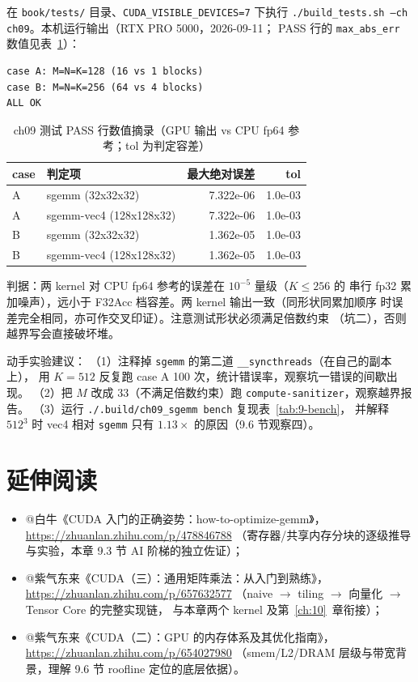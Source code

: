 在 \texttt{book/tests/} 目录、\texttt{CUDA\_\allowbreak{}VISIBLE\_\allowbreak{}DEVICES=\allowbreak{}7} 下执行
\texttt{.\allowbreak{}/\allowbreak{}build\_\allowbreak{}tests.\allowbreak{}sh --ch ch09}。本机运行输出（RTX PRO 5000，2026-09-11；
PASS 行的 \texttt{max\_abs\_err} 数值见表~\ref{tab:9-pass}）：

\begin{lstlisting}[style=console]
case A: M=N=K=128 (16 vs 1 blocks)
case B: M=N=K=256 (64 vs 4 blocks)
ALL OK
\end{lstlisting}

\begin{table}[htbp]
\centering
\caption{ch09 测试 PASS 行数值摘录（GPU 输出 vs CPU fp64 参考；tol 为判定容差）}
\label{tab:9-pass}
\begin{tabular}{llrr}
\toprule
case & 判定项 & 最大绝对误差 & tol \\
\midrule
A & sgemm (32x32x32)      & 7.322e-06 & 1.0e-03 \\
A & sgemm-vec4 (128x128x32) & 7.322e-06 & 1.0e-03 \\
B & sgemm (32x32x32)      & 1.362e-05 & 1.0e-03 \\
B & sgemm-vec4 (128x128x32) & 1.362e-05 & 1.0e-03 \\
\bottomrule
\end{tabular}
\end{table}

判据：两 kernel 对 CPU fp64 参考的误差在 $10^{-5}$ 量级（$K \le 256$ 的
串行 fp32 累加噪声），远小于 F32Acc 档容差。两 kernel 输出一致（同形状同累加顺序
时误差完全相同，亦可作交叉印证）。注意测试形状必须满足倍数约束
（坑二），否则越界写会直接破坏堆。

动手实验建议：
（1）注释掉 \texttt{sgemm} 的第二道 \texttt{\_\allowbreak{}\_\allowbreak{}syncthreads}（在自己的副本上），
用 $K = 512$ 反复跑 case A 100 次，统计错误率，观察坑一错误的间歇出现。
（2）把 $M$ 改成 33（不满足倍数约束）跑 \texttt{compute-sanitizer}，观察越界报告。
（3）运行 \texttt{.\allowbreak{}/\allowbreak{}.\allowbreak{}build/\allowbreak{}ch09\_\allowbreak{}sgemm bench} 复现表~\ref{tab:9-bench}，
并解释 $512^3$ 时 vec4 相对 \texttt{sgemm} 只有 $1.13\times$ 的原因（9.6 节观察四）。

\section*{延伸阅读}

\begin{itemize}
  \item @白牛《CUDA 入门的正确姿势：how-to-optimize-gemm》，
        \url{https://zhuanlan.zhihu.com/p/478846788}
        （寄存器/共享内存分块的逐级推导与实验，本章 9.3 节 AI 阶梯的独立佐证）；
  \item @紫气东来《CUDA（三）：通用矩阵乘法：从入门到熟练》，
        \url{https://zhuanlan.zhihu.com/p/657632577}
        （naive $\to$ tiling $\to$ 向量化 $\to$ Tensor Core 的完整实现链，
        与本章两个 kernel 及第~\ref{ch:10}~章衔接）；
  \item @紫气东来《CUDA（二）：GPU 的内存体系及其优化指南》，
        \url{https://zhuanlan.zhihu.com/p/654027980}
        （smem/L2/DRAM 层级与带宽背景，理解 9.6 节 roofline 定位的底层依据）。
\end{itemize}
